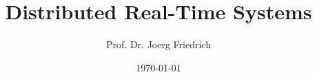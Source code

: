 
\usepackage[utf8]{inputenc}
\usepackage[ngerman]{babel} %
\usepackage[T1]{fontenc}    %
\usepackage{textcomp}       %
\usepackage{mathptmx}              %
\usepackage[scaled=.90]{helvet}    %

\usepackage{booktabs}
\usepackage{multimedia}
\usepackage{listings}
\usepackage{enumerate}
\usepackage{longtable}



\vspace*{1ex}


\title{Distributed Real-Time Systems}


\author{Prof. Dr. Joerg Friedrich
\and
 }




\date[\copyright{} 2011]{\today}

